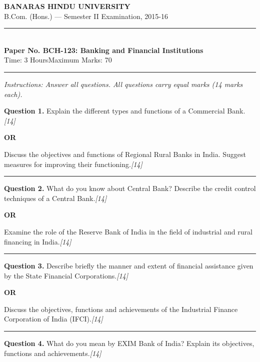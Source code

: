 \documentclass[11pt,a4paper]{article}
\newcommand{\pts}[1]{\hfill   \textit{[#1]}}
\begin{document}
\begin{center}
  {\large\bfseries BANARAS HINDU UNIVERSITY}\\[2pt]
  {\normalsize B.Com. (Hons.) --- Semester II Examination, 2015-16}\\[6pt]
  \rule{0.8\linewidth}{0.5pt}\\[6pt]
  {\large\bfseries Paper No. BCH-123: Banking and Financial Institutions}\\[4pt]
  {\normalsize Time: 3 Hours\hfill Maximum Marks: 70}
\end{center}

\rule{\linewidth}{0.4pt}

\smallskip



\noindent   \textit{Instructions: Answer all questions. All questions carry equal marks (14 marks each).}

\bigskip




\noindent   \textbf{Question 1.}
Explain the different types and functions of a Commercial Bank.\pts{14}

\centerline{   \textbf{OR}}

Discuss the objectives and functions of Regional Rural Banks in India. Suggest measures for improving their functioning.\pts{14}

\medskip\rule{\linewidth}{0.2pt}




\noindent   \textbf{Question 2.}
What do you know about Central Bank? Describe the credit control techniques of a Central Bank.\pts{14}

\centerline{   \textbf{OR}}

Examine the role of the Reserve Bank of India in the field of industrial and rural financing in India.\pts{14}

\medskip\rule{\linewidth}{0.2pt}




\noindent   \textbf{Question 3.}
Describe briefly the manner and extent of financial assistance given by the State Financial Corporations.\pts{14}

\centerline{   \textbf{OR}}

Discuss the objectives, functions and achievements of the Industrial Finance Corporation of India (IFCI).\pts{14}

\medskip\rule{\linewidth}{0.2pt}




\noindent   \textbf{Question 4.}
What do you mean by EXIM Bank of India? Explain its objectives, functions and achievements.\pts{14}
\end{document}
